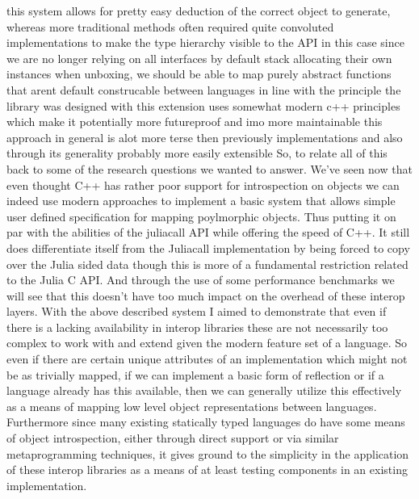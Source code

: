 {}\markdownRendererInterblockSeparator
{}this system allows for pretty easy deduction of the correct object to generate, whereas more traditional methods often required quite convoluted implementations to make the type hierarchy visible to the API in this case since we are no longer relying on all interfaces by default stack allocating their own instances when unboxing, we should be able to map purely abstract functions that arent default construcable between languages in line with the principle the library was designed with this extension uses somewhat modern c++ principles which make it potentially more futureproof and imo more maintainable this approach in general is alot more terse then previously implementations and also through its generality probably more easily extensible \markdownRendererInterblockSeparator
{}\markdownRendererInterblockSeparator
{}So, to relate all of this back to some of the research questions we wanted to answer. We've seen now that even thought C++ has rather poor support for introspection on objects we can indeed use modern approaches to implement a basic system that allows simple user defined specification for mapping poylmorphic objects.\markdownRendererInterblockSeparator
{}Thus putting it on par with the abilities of the juliacall API while offering the speed of C++. It still does differentiate itself from the Juliacall implementation by being forced to copy over the Julia sided data though this is more of a fundamental restriction related to the Julia C API. And through the use of some performance benchmarks we will see that this doesn't have too much impact on the overhead of these interop layers. \markdownRendererInterblockSeparator
{}With the above described system I aimed to demonstrate that even if there is a lacking availability in interop libraries these are not necessarily too complex to work with and extend given the modern feature set of a language. So even if there are certain unique attributes of an implementation which might not be as trivially mapped, if we can implement a basic form of reflection or if a language already has this available, then we can generally utilize this effectively as a means of mapping low level object representations between languages.\markdownRendererInterblockSeparator
{}Furthermore since many existing statically typed languages do have some means of object introspection, either through direct support or via similar metaprogramming techniques, it gives ground to the simplicity in the application of these interop libraries as a means of at least testing components in an existing implementation.\markdownRendererInterblockSeparator
